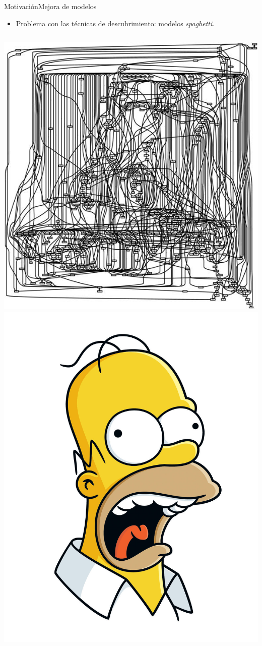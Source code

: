 \documentclass[spanish,pdf]{beamer}
\begin{document}
\begin{frame}{Motivación}{Mejora de modelos}
  \begin{itemize}
    \item<1-> Problema con las técnicas de descubrimiento: modelos \textit{spaghetti}.
  \end{itemize}
  \pause[2]
  \begin{columns}
      \pause[3]
      \centering
      \includegraphics[width=0.8\linewidth]{img/spaghetti_model_2.jpg}
      \pause[4]
      \centering
      \includegraphics[width=0.5\linewidth]{img/homero_grita.jpg}


\end{columns}
\end{frame}
\end{document}
